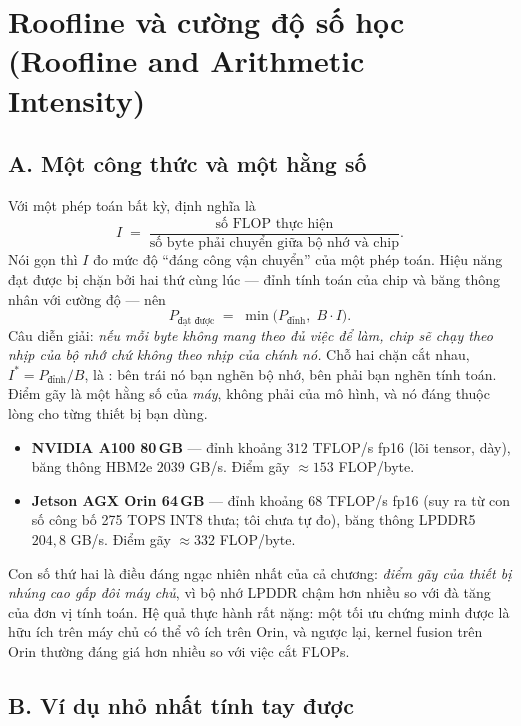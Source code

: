 \documentclass[../../deep_learning.tex]{subfiles}
\begin{document}
\section{Roofline và cường độ số học (Roofline and Arithmetic Intensity)}

\subsection{A. Một công thức và một hằng số}

Với một phép toán bất kỳ, định nghĩa  là
\[
I \;=\; \frac{\text{số FLOP thực hiện}}{\text{số byte phải chuyển giữa bộ nhớ và chip}} .
\]
Nói gọn thì \(I\) đo mức độ ``đáng công vận chuyển'' của một phép toán. Hiệu năng đạt được bị chặn bởi hai thứ cùng lúc --- đỉnh tính toán của chip và băng thông nhân với cường độ --- nên \cite{williams2009roofline}
\[
P_{\text{đạt được}} \;=\; \min\bigl(P_{\text{đỉnh}},\; B \cdot I\bigr).
\]
Câu diễn giải: \emph{nếu mỗi byte không mang theo đủ việc để làm, chip sẽ chạy theo nhịp của bộ nhớ chứ không theo nhịp của chính nó.} Chỗ hai chặn cắt nhau, \(I^{*} = P_{\text{đỉnh}}/B\), là : bên trái nó bạn nghẽn bộ nhớ, bên phải bạn nghẽn tính toán. Điểm gãy là một hằng số của \emph{máy}, không phải của mô hình, và nó đáng thuộc lòng cho từng thiết bị bạn dùng.

\begin{itemize}
\item \textbf{NVIDIA A100 80\,GB} --- đỉnh khoảng \(312\) TFLOP/s fp16 (lõi tensor, dày), băng thông HBM2e \(2039\) GB/s. Điểm gãy \(\approx 153\) FLOP/byte.
\item \textbf{Jetson AGX Orin 64\,GB} --- đỉnh khoảng \(68\) TFLOP/s fp16 (suy ra từ con số công bố 275 TOPS INT8 thưa; tôi chưa tự đo), băng thông LPDDR5 \(204{,}8\) GB/s. Điểm gãy \(\approx 332\) FLOP/byte.
\end{itemize}

Con số thứ hai là điều đáng ngạc nhiên nhất của cả chương: \emph{điểm gãy của thiết bị nhúng cao gấp đôi máy chủ}, vì bộ nhớ LPDDR chậm hơn nhiều so với đà tăng của đơn vị tính toán. Hệ quả thực hành rất nặng: một tối ưu chứng minh được là hữu ích trên máy chủ có thể vô ích trên Orin, và ngược lại, kernel fusion trên Orin thường đáng giá hơn nhiều so với việc cắt FLOPs.

\subsection{B. Ví dụ nhỏ nhất tính tay được}
\end{document}
